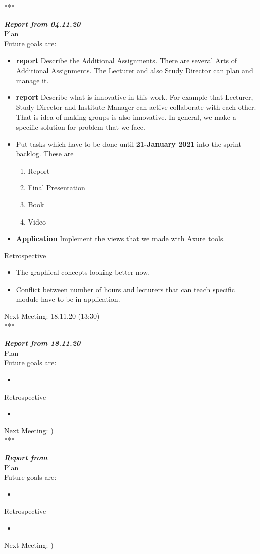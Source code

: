 \documentclass{scrartcl}
\begin{document}
\****

\textbf{\textit{Report from 04.11.20  }}\\
Plan\\
Future goals are: 
\begin{itemize}
  \item \textbf{report} Describe the Additional Assignments. There are several Arts of Additional Assignments. The Lecturer and also Study Director can plan and manage it.
  \item \textbf{report} Describe what is innovative in this work. For example that Lecturer, Study Director and Institute Manager can active collaborate with each other. That is idea of making groups is also innovative. In general, we make a specific solution for problem that we face.
  \item Put tasks which have to be done until \textbf{21-January 2021} into the sprint backlog. These are 
  \begin{enumerate}
  \item Report
  \item Final Presentation
  \item Book
  \item Video
  \end{enumerate}
\item \textbf{Application} Implement the views that we made with Axure tools.
\end{itemize}	

Retrospective\\
\begin{itemize}
\item The graphical concepts looking better now.
\item Conflict between number of hours and lecturers that can teach specific module have to be in application.

\end{itemize}
Next Meeting: 18.11.20 (13:30)\\

\****

\textbf{\textit{Report from 18.11.20  }}\\
Plan\\
Future goals are: 
\begin{itemize}
  \item 
\end{itemize}	
Retrospective\\
\begin{itemize}

\item
\end{itemize}
Next Meeting: )\\

\****

\textbf{\textit{Report from  }}\\
Plan\\
Future goals are: 
\begin{itemize}
   \item
\end{itemize}	
Retrospective\\
\begin{itemize}
\item

\end{itemize}
Next Meeting: )\\
\end{document}
